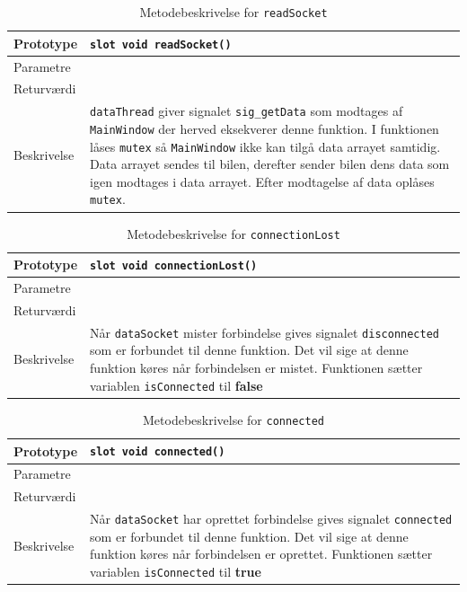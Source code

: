 \begin{table}[H]
\begin{tabularx}{\textwidth}{| L{2.5 cm} | Z |} \hline
Prototype & \texttt{slot void readSocket()} \\\hline
Parametre &   \\\hline
Returværdi &  \\\hline
Beskrivelse & \texttt{dataThread} giver signalet \texttt{sig\_getData} som modtages af \texttt{MainWindow} der herved eksekverer denne funktion. I funktionen låses \texttt{mutex} så \texttt{MainWindow} ikke kan tilgå data arrayet samtidig. Data arrayet sendes til bilen, derefter sender bilen dens data som igen modtages i data arrayet. Efter modtagelse af data oplåses \texttt{mutex}. \\\hline
\end{tabularx}
\caption{Metodebeskrivelse for \texttt{readSocket}}
\label{table:met_readSocket}
\end{table}

\begin{table}[H]
\begin{tabularx}{\textwidth}{| L{2.5 cm} | Z |} \hline
Prototype & \texttt{slot void connectionLost()} \\\hline
Parametre &   \\\hline
Returværdi &  \\\hline
Beskrivelse & Når \texttt{dataSocket} mister forbindelse gives signalet \texttt{disconnected} som er forbundet til denne funktion. Det vil sige at denne funktion køres når forbindelsen er mistet. Funktionen sætter variablen \texttt{isConnected} til \textbf{false}  \\\hline
\end{tabularx}
\caption{Metodebeskrivelse for \texttt{connectionLost}}
\label{table:met_connectionLost}
\end{table}

\begin{table}[H]
\begin{tabularx}{\textwidth}{| L{2.5 cm} | Z |} \hline
Prototype & \texttt{slot void connected()} \\\hline
Parametre &   \\\hline
Returværdi &  \\\hline
Beskrivelse & Når \texttt{dataSocket} har oprettet forbindelse gives signalet \texttt{connected} som er forbundet til denne funktion. Det vil sige at denne funktion køres når forbindelsen er oprettet. Funktionen sætter variablen \texttt{isConnected} til \textbf{true}  \\\hline
\end{tabularx}
\caption{Metodebeskrivelse for \texttt{connected}}
\label{table:met_connected}
\end{table}


